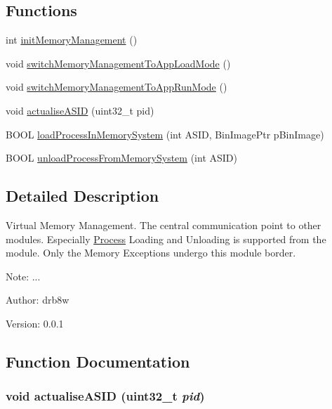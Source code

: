 \subsection*{Functions}
\begin{CompactItemize}
\item 
int \hyperlink{group___v_m_m_g243fac608384b4b91246e465a206e72d}{initMemoryManagement} ()
\item 
void \hyperlink{group___v_m_m_g95c733b81f5f912811660319f6dede57}{switchMemoryManagementToAppLoadMode} ()
\item 
void \hyperlink{group___v_m_m_g5c5572a6e8f5df265dd936c6e3e9c062}{switchMemoryManagementToAppRunMode} ()
\item 
void \hyperlink{group___v_m_m_g818719d1d1577fd4cb90e1ef13994386}{actualiseASID} (uint32\_\-t pid)
\item 
BOOL \hyperlink{group___v_m_m_gfbd1dbe50bf30f665f1a4fc181655778}{loadProcessInMemorySystem} (int ASID, BinImagePtr pBinImage)
\item 
BOOL \hyperlink{group___v_m_m_g8769d0f39e7a7bab4a27e72db8b31ef3}{unloadProcessFromMemorySystem} (int ASID)
\end{CompactItemize}


\subsection{Detailed Description}
Virtual Memory Management. The central communication point to other modules. Especially \hyperlink{struct_process}{Process} Loading and Unloading is supported from the module. Only the Memory Exceptions undergo this module border. 

\begin{Desc}
\item[Note:]... \end{Desc}
\begin{Desc}
\item[Author:]drb8w \end{Desc}
\begin{Desc}
\item[Version:]0.0.1 \end{Desc}


\subsection{Function Documentation}
\hypertarget{group___v_m_m_g818719d1d1577fd4cb90e1ef13994386}{
\subsubsection[{actualiseASID}]{\setlength{\rightskip}{0pt plus 5cm}void actualiseASID (uint32\_\-t {\em pid})}}
\label{group___v_m_m_g818719d1d1577fd4cb90e1ef13994386}


